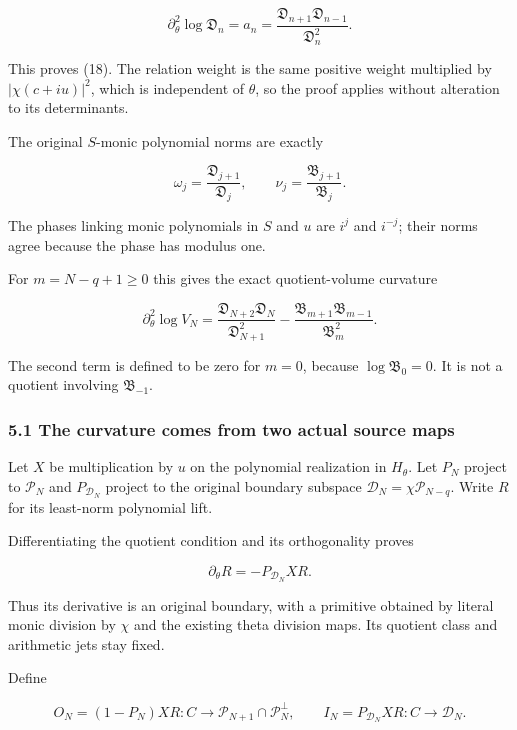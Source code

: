 \[
\partial_\theta^2\log\mathfrak D_n=a_n
=\frac{\mathfrak D_{n+1}\mathfrak D_{n-1}}{\mathfrak D_n^2}.
\]

This proves (18). The relation weight is the same positive weight
multiplied by \(|\chi(c+iu)|^2\), which is independent of \(\theta\), so
the proof applies without alteration to its determinants.

The original \(S\)-monic polynomial norms are exactly

\[
\omega_j=\frac{\mathfrak D_{j+1}}{\mathfrak D_j},\qquad
\nu_j=\frac{\mathfrak B_{j+1}}{\mathfrak B_j}.
\tag{19}
\]

The phases linking monic polynomials in \(S\) and \(u\) are \(i^j\) and
\(i^{-j}\); their norms agree because the phase has modulus one.

For \(m=N-q+1\ge0\) this gives the exact quotient-volume curvature

\[
\boxed{
\partial_\theta^2\log V_N
=\frac{\mathfrak D_{N+2}\mathfrak D_N}{\mathfrak D_{N+1}^2}
-\frac{\mathfrak B_{m+1}\mathfrak B_{m-1}}{\mathfrak B_m^2}.
}
\tag{20}
\]

The second term is defined to be zero for \(m=0\), because
\(\log\mathfrak B_0=0\). It is not a quotient involving
\(\mathfrak B_{-1}\).

\subsubsection{5.1 The curvature comes from two actual source
maps}\label{toda_volume:the-curvature-comes-from-two-actual-source-maps}

Let \(X\) be multiplication by \(u\) on the polynomial realization in
\(H_\theta\). Let \(P_N\) project to \(\mathcal P_N\) and
\(P_{\mathcal D_N}\) project to the original boundary subspace
\(\mathcal D_N=\chi\mathcal P_{N-q}\). Write \(R\) for its least-norm
polynomial lift.

Differentiating the quotient condition and its orthogonality proves

\[
\partial_\theta R=-P_{\mathcal D_N}XR.
\tag{21}
\]

Thus its derivative is an original boundary, with a primitive obtained
by literal monic division by \(\chi\) and the existing theta division
maps. Its quotient class and arithmetic jets stay fixed.

Define

\[
O_N=(1-P_N)XR:C\to\mathcal P_{N+1}\cap\mathcal P_N^\perp,
\qquad
I_N=P_{\mathcal D_N}XR:C\to\mathcal D_N.
\]

